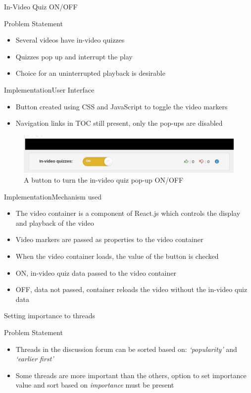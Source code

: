 \documentclass[xcolor=table]{beamer}
\begin{document}
\begin{frame}{In-Video Quiz ON/OFF}
	\begin{block}{Problem Statement}
	\begin{itemize}
		\item Several videos have in-video quizzes
		\item Quizzes pop up and interrupt the play
		\item Choice for an uninterrupted playback is desirable
	\end{itemize}
	\end{block}
\end{frame}

\begin{frame}{Implementation}{User Interface}
\begin{itemize}
	\item Button created using CSS and JavaScript to toggle the video markers
	\item Navigation links in TOC still present, only the pop-ups are disabled
\end{itemize}
\begin{figure}
\centering
\includegraphics[width=0.7\linewidth]{./media/toggle_ui}
\caption{A button to turn the in-video quiz pop-up ON/OFF}
\label{fig:toggle_ui}
\end{figure}
\end{frame}

\begin{frame}{Implementation}{Mechanism used}
\begin{itemize}
	\item The video container is a component of React.js which controls the display and playback of the video
	\item Video markers are passed as properties to the video container
	\item When the video container loads, the value of the button is checked
	\item ON, in-video quiz data passed to the video container
	\item OFF, data not passed, container  reloads the video without the in-video quiz data
\end{itemize}
\end{frame}

\begin{frame}{Setting importance to threads}
\begin{block}{Problem Statement}
	\begin{itemize}
	\item Threads in the discussion forum can be sorted based on: \textit{`popularity'} and \textit{`earlier first'}
	\item Some threads are more important than the others, option to set importance value and sort based on \textit{importance} must be present
	\end{itemize}
\end{block}
\end{frame}
\end{document}
